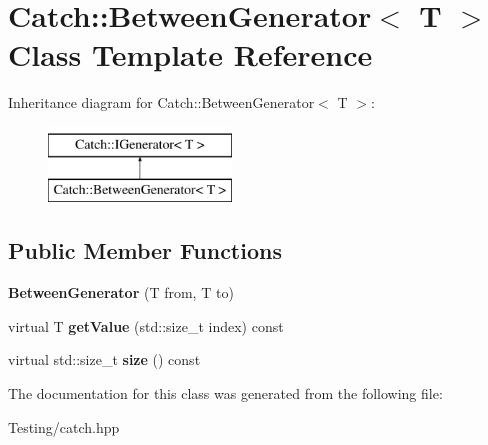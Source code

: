 \hypertarget{class_catch_1_1_between_generator}{\section{Catch\-:\-:Between\-Generator$<$ T $>$ Class Template Reference}
\label{class_catch_1_1_between_generator}
}
Inheritance diagram for Catch\-:\-:Between\-Generator$<$ T $>$\-:\begin{figure}[H]
\begin{center}
\leavevmode
\includegraphics[height=2.000000cm]{class_catch_1_1_between_generator}
\end{center}
\end{figure}
\subsection*{Public Member Functions}
\begin{DoxyCompactItemize}
\item 
\hypertarget{class_catch_1_1_between_generator_a835a057d691ae37caef660624099b51c}{{\bfseries Between\-Generator} (T from, T to)}\label{class_catch_1_1_between_generator_a835a057d691ae37caef660624099b51c}

\item 
\hypertarget{class_catch_1_1_between_generator_af83575d62cc727ca995446cff4d6c26c}{virtual T {\bfseries get\-Value} (std\-::size\-\_\-t index) const }\label{class_catch_1_1_between_generator_af83575d62cc727ca995446cff4d6c26c}

\item 
\hypertarget{class_catch_1_1_between_generator_aa53a04a259e796ba2b5adabed79474b5}{virtual std\-::size\-\_\-t {\bfseries size} () const }\label{class_catch_1_1_between_generator_aa53a04a259e796ba2b5adabed79474b5}

\end{DoxyCompactItemize}


The documentation for this class was generated from the following file\-:\begin{DoxyCompactItemize}
\item 
Testing/catch.\-hpp\end{DoxyCompactItemize}
